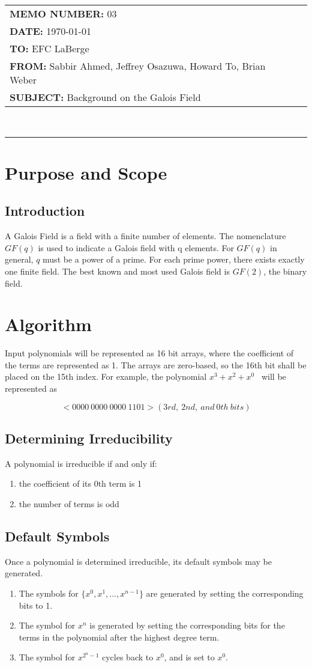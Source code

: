 \documentclass[paper=usletter, fontsize=12pt]{article}
\newcommand{\Sabbir}{Sabbir Ahmed}
\newcommand{\Jeffrey}{Jeffrey Osazuwa}
\newcommand{\Howard}{Howard To}
\newcommand{\Brian}{Brian Weber}
\newcommand{\polynomial}{$x^{3}+x^{2}+x^{0}$}
\newcommand{\documentinfo}[5]{
    \begin{centering}
        \parbox{2in}{
        \begin{spacing}{1}
            \begin{flushleft}
                \begin{tabular}{l l}
                    #1 \\
                    #2 \\
                    #3 \\
                    #4 \\
                    #5 \\
                \end{tabular}\\
                \rule{\textwidth}{1pt}
            \end{flushleft}
        \end{spacing}
        }
    \end{centering}
}
\begin{document}
     \documentinfo{\textbf{MEMO NUMBER:} 03}{\textbf{DATE:} \today}{\textbf{TO: } EFC LaBerge}{\textbf{FROM: }\Sabbir, \Jeffrey, \Howard, \Brian}{\textbf{SUBJECT: } Background on the Galois Field}
    \vspace{-0.1in}

    \section{Purpose and Scope}

        \subsection{Introduction}
        A Galois Field is a field with a finite number of elements. The nomenclature $GF(q)$ is used to indicate a Galois field with q elements. For $GF(q)$ in general, $q$ must be a power of a prime. For each prime power, there exists exactly one finite field. The best known and most used Galois field is $GF(2)$, the binary field.

    \section{Algorithm}
    Input polynomials will be represented as 16 bit arrays, where the coefficient of the terms are represented as 1. The arrays are zero-based, so the 16th bit shall be placed on the 15th index. For example, the polynomial \polynomial~ will be represented as

        \[ <0000 \ 0000 \ 0000 \ 1101> (3rd, \ 2nd, \ and \ 0th \ bits) \]

        \subsection{Determining Irreducibility}
        A polynomial is irreducible if and only if:
        \begin{enumerate}
            \item the coefficient of its 0th term is 1
            \item the number of terms is odd
        \end{enumerate}

        \subsection{Default Symbols}
        Once a polynomial is determined irreducible, its default symbols may be generated.
        \begin{enumerate}
            \item The symbols for $\{x^{0}, x^{1}, \ldots, x^{n-1}\}$ are generated by setting the corresponding bits to 1.
            \item The symbol for $x^{n}$ is generated by setting the corresponding bits for the terms in the polynomial after the highest degree term.
            \item The symbol for $x^{2^{n}-1}$ cycles back to $x^{0}$, and is set to $x^{0}$.
        \end{enumerate}
\end{document}
